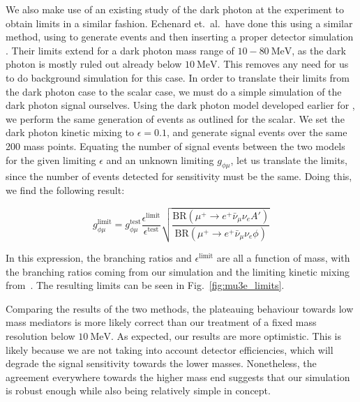 We also make use of an existing study of the dark photon at the \mueee experiment to obtain limits in a similar fashion.
Echenard et.\ al.\ have done this using a similar method, using \madgraph to generate events and then inserting a proper detector simulation \cite{Echenard:2014lma}.
Their limits extend for a dark photon mass range of $10 - 80~\textrm{MeV}$, as the dark photon is mostly ruled out already below $10~\textrm{MeV}$.
This removes any need for us to do background simulation for this case.
In order to translate their limits from the dark photon case to the scalar case, we must do a simple simulation of the dark photon signal ourselves.
Using the dark photon model developed earlier for \madgraph, we perform the same generation of events as outlined for the scalar.
We set the dark photon kinetic mixing to $\epsilon = 0.1$, and generate signal events over the same 200 mass points.
Equating the number of signal events between the two models for the given limiting $\epsilon$ and an unknown limiting $g_{\phi\mu}$, let us translate the limits, since the number of events detected for sensitivity must be the same.
Doing this, we find the following result:

\begin{equation}
    g_{\phi\mu}^\textrm{limit} = g_{\phi\mu}^\textrm{test} \frac{\epsilon^\textrm{limit}}{\epsilon^\textrm{test}}\sqrt{\frac{\textrm{BR}(\mu^+ \rightarrow e^+ \bar{\nu}_\mu \nu_e A')}{\textrm{BR}(\mu^+ \rightarrow e^+ \bar{\nu}_\mu \nu_e \phi)}}
    \label{eqn:gphi_limit_echenard}
\end{equation}

\noindent In this expression, the branching ratios and $\epsilon^\textrm{limit}$ are all a function of mass, with the branching ratios coming from our simulation and the limiting kinetic mixing from~\cite{Echenard:2014lma}.
The resulting limits can be seen in Fig.~\ref{fig:mu3e_limits}.

Comparing the results of the two methods, the plateauing behaviour towards low mass mediators is more likely correct than our treatment of a fixed mass resolution below $10~\textrm{MeV}$.
As expected, our results are more optimistic.
This is likely because we are not taking into account detector efficiencies, which will degrade the signal sensitivity towards the lower masses.
Nonetheless, the agreement everywhere towards the higher mass end suggests that our simulation is robust enough while also being relatively simple in concept.
